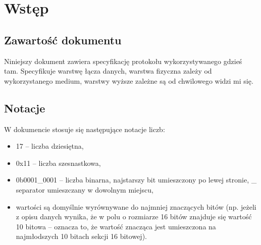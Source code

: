 \section{Wstęp}
\label{Sec_Wstep}

\subsection{Zawartość dokumentu}
\label{SubSec_zawartosc}
Niniejszy dokument zawiera specyfikację protokołu \NAME wykorzystywanego gdzieś tam. Specyfikuje warstwę łącza danych, warstwa fizyczna zależy od wykorzystanego medium, warstwy wyższe zależne są od chwilowego widzi mi się.

\subsection{Notacje}
\label{SUbSec_notacje}
W dokumencie stosuje się następujące notacje liczb:
\begin{itemize}
	\item 17 -- liczba dziesiętna,
	\item 0x11 -- liczba szesnastkowa,
	\item 0b0001\_0001 -- liczba binarna, najstarszy bit umieszczony po lewej stronie, \_ separator umieszczany w dowolnym miejscu,
	\item wartości są domyślnie wyrównywane do najmniej znaczących bitów (np. jeżeli z opisu danych wynika, że w polu o rozmiarze 16 bitów znajduje się wartość 10 bitowa -- oznacza to, że wartość znacząca jest umieszczona na najmłodszych 10 bitach sekcji 16 bitowej).
	
\end{itemize}
